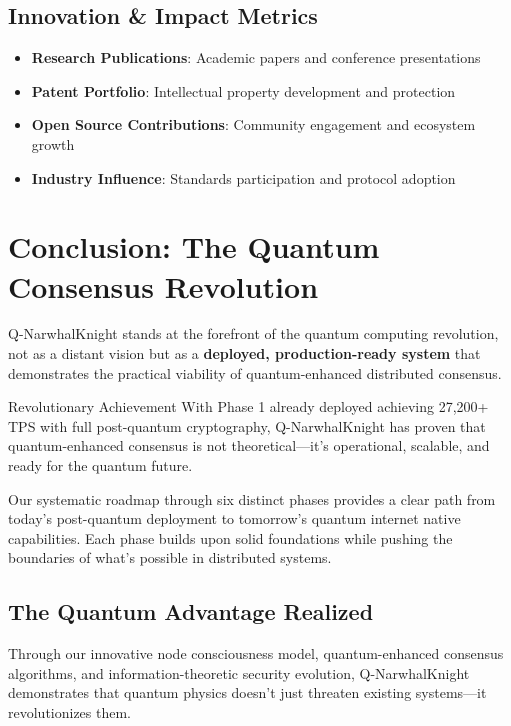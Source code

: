 \documentclass[11pt,a4paper]{article}
\begin{document}
\subsection{Innovation \& Impact Metrics}

\begin{itemize}
\item \textbf{Research Publications}: Academic papers and conference presentations
\item \textbf{Patent Portfolio}: Intellectual property development and protection
\item \textbf{Open Source Contributions}: Community engagement and ecosystem growth
\item \textbf{Industry Influence}: Standards participation and protocol adoption
\end{itemize}

\section{Conclusion: The Quantum Consensus Revolution}

Q-NarwhalKnight stands at the forefront of the quantum computing revolution, not as a distant vision but as a \textbf{deployed, production-ready system} that demonstrates the practical viability of quantum-enhanced distributed consensus.

\begin{achievementbox}{Revolutionary Achievement}
With Phase 1 already deployed achieving 27,200+ TPS with full post-quantum cryptography, Q-NarwhalKnight has proven that quantum-enhanced consensus is not theoretical—it's operational, scalable, and ready for the quantum future.
\end{achievementbox}

Our systematic roadmap through six distinct phases provides a clear path from today's post-quantum deployment to tomorrow's quantum internet native capabilities. Each phase builds upon solid foundations while pushing the boundaries of what's possible in distributed systems.

\subsection{The Quantum Advantage Realized}

Through our innovative node consciousness model, quantum-enhanced consensus algorithms, and information-theoretic security evolution, Q-NarwhalKnight demonstrates that quantum physics doesn't just threaten existing systems—it revolutionizes them.
\end{document}
